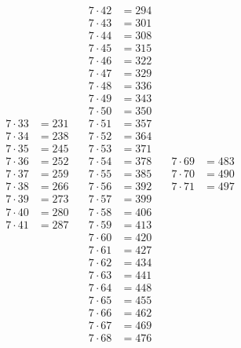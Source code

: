 \documentclass[12pt]{article}
\theoremstyle{definition}
\numberwithin{equation}{qn}
\begin{document}
\begin{enumerate}
$$\begin{matrix}
            7 \cdot 33 &= 231 \\ 7 \cdot 34 &= 238 \\ 7 \cdot 35 &= 245 \\
            7 \cdot 36 &= 252 \\ 7 \cdot 37 &= 259 \\ 7 \cdot 38 &= 266 \\
            7 \cdot 39 &= 273 \\ 7 \cdot 40 &= 280 \\ 7 \cdot 41 &= 287 \\
        \end{matrix} \quad \begin{matrix}
            7 \cdot 42 &= 294 \\ 7 \cdot 43 &= 301 \\ 7 \cdot 44 &= 308 \\
            7 \cdot 45 &= 315 \\ 7 \cdot 46 &= 322 \\ 7 \cdot 47 &= 329 \\
            7 \cdot 48 &= 336 \\ 7 \cdot 49 &= 343 \\ 7 \cdot 50 &= 350 \\
            7 \cdot 51 &= 357 \\ 7 \cdot 52 &= 364 \\ 7 \cdot 53 &= 371 \\
            7 \cdot 54 &= 378 \\ 7 \cdot 55 &= 385 \\ 7 \cdot 56 &= 392 \\
            7 \cdot 57 &= 399 \\ 7 \cdot 58 &= 406 \\ 7 \cdot 59 &= 413 \\
            7 \cdot 60 &= 420 \\ 7 \cdot 61 &= 427 \\ 7 \cdot 62 &= 434 \\
            7 \cdot 63 &= 441 \\ 7 \cdot 64 &= 448 \\ 7 \cdot 65 &= 455 \\
            7 \cdot 66 &= 462 \\ 7 \cdot 67 &= 469 \\ 7 \cdot 68 &= 476 \\
        \end{matrix} \quad \begin{matrix}
            7 \cdot 69 &= 483 \\ 7 \cdot 70 &= 490 \\ 7 \cdot 71 &= 497 \\

\end{matrix}$$
\end{enumerate}
\end{document}
